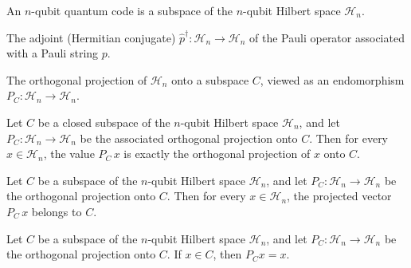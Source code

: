 \begin{definition}
\label{Code}
\leanok
{}
An $n$-qubit quantum code is a subspace of the $n$-qubit Hilbert space $\mathcal{H}_n$.
\end{definition}

\begin{definition}
\label{pauliOpAdjoint}
\leanok
{}
The adjoint (Hermitian conjugate) $\hat{p}^\dagger : \mathcal{H}_n \to \mathcal{H}_n$ of the
Pauli operator associated with a Pauli string $p$.
\end{definition}

\begin{definition}
\label{codeProj}
\leanok
{}
The orthogonal projection of $\mathcal{H}_n$ onto a subspace $C$, viewed as an endomorphism
$P_C : \mathcal{H}_n \to \mathcal{H}_n$.
\end{definition}

\begin{lemma}
\label{codeProj_apply}
\leanok
{}
Let $C$ be a closed subspace of the $n$-qubit Hilbert space $\mathcal{H}_n$, and let
$P_C : \mathcal{H}_n \to \mathcal{H}_n$ be the associated orthogonal projection onto
$C$. Then for every $x \in \mathcal{H}_n$, the value $P_C\,x$ is exactly the orthogonal
projection of $x$ onto $C$.
\end{lemma}

\begin{lemma}
\label{codeProj_mem}
\leanok
{}
Let $C$ be a subspace of the $n$-qubit Hilbert space $\mathcal{H}_n$, and let $P_C :
\mathcal{H}_n \to \mathcal{H}_n$ be the orthogonal projection onto $C$. Then for every
$x \in \mathcal{H}_n$, the projected vector $P_C\,x$ belongs to $C$.
\end{lemma}

\begin{lemma}
\label{codeProj_eq_self_of_mem}
\leanok
{}
Let $C$ be a subspace of the $n$-qubit Hilbert space $\mathcal{H}_n$, and let $P_C :
\mathcal{H}_n \to \mathcal{H}_n$ be the orthogonal projection onto $C$. If $x \in C$,
then $P_C x = x$.
\end{lemma}

